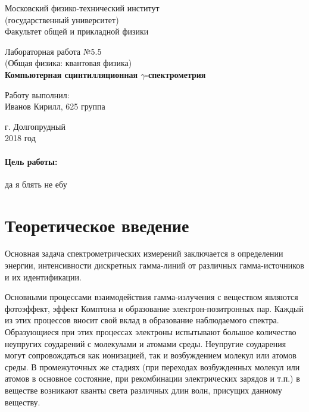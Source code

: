 \documentclass[12pt]{kiarticle}
\newcommand{\ga}{\ensuremath{\gamma}}
\begin{document}
	
	\begin{titlepage}
		\begin{center}
			\large 	Московский физико-технический институт \\
			(государственный университет) \\
			Факультет общей и прикладной физики \\
			\vspace{0.2cm}
			
			\vspace{4.5cm}
			Лабораторная работа №5.5  \\ \vspace{0.2cm}
			\large (Общая физика: квантовая физика) \\ \vspace{0.2cm}
			\LARGE \textbf{Компьютерная сцинтилляционная \ga-спектрометрия }
		\end{center}
		\vspace{2.3cm} \large
		
		\begin{center}
			Работу выполнил: \\
			Иванов Кирилл,
			625 группа
			\vspace{10mm}		
			
		\end{center}
		
		\begin{center} \vspace{60mm}
			г. Долгопрудный \\
			2018 год
		\end{center}
	\end{titlepage}


	\paragraph*{Цель работы:} да я блять не ебу 
	
	
	
	\section{Теоретическое введение}
	
	Основная задача спектрометрических измерений заключается в определении энергии, интенсивности дискретных гамма-линий от различных гамма-источников и их идентификации.
	
	Основными процессами взаимодействия гамма-излучения с веществом являются фотоэффект, эффект Комптона и образование электрон-позитронных пар. Каждый из этих процессов вносит свой вклад в образование наблюдаемого спектра. Образующиеся при этих процессах электроны испытывают большое количество неупругих соударений с молекулами и атомами среды. Неупругие соударения могут сопровождаться как ионизацией, так и возбуждением молекул или атомов среды. В промежуточных же стадиях (при переходах возбужденных молекул или атомов в основное состояние, при рекомбинации электрических зарядов и т.п.) в веществе возникают кванты света различных длин волн, присущих данному веществу.
	
\end{document}
